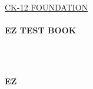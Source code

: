 \documentclass[xetex,11pt,twoside,openany]{book}
\renewcommand{\LARGE}{\fontsize{16}{18}\selectfont}
\begin{document}
\begin{titlepage}
\begin{center}
\textsc{\href{http://www.ck12.org}{\fontsize{18}{24}\selectfont CK-12 F\fontsize{14}{24}\selectfont OUNDATION}}\\[1.5cm]
 
\HRule\hrulefill \\[0.8cm]
\linespread{1.1}
\Huge{} \textbf{EZ TEST BOOK}

\linespread{1.0}
\\
\HRule \hrulefill
~\vfill
\begin{minipage}[b]{0.8\textwidth}
\begin{center} \Large

\textbf{EZ}

\end{center}
\end{minipage}
 
 
\end{center}
 
\end{titlepage}
\newpage
~\vfill
\thispagestyle{empty}
\end{document}
